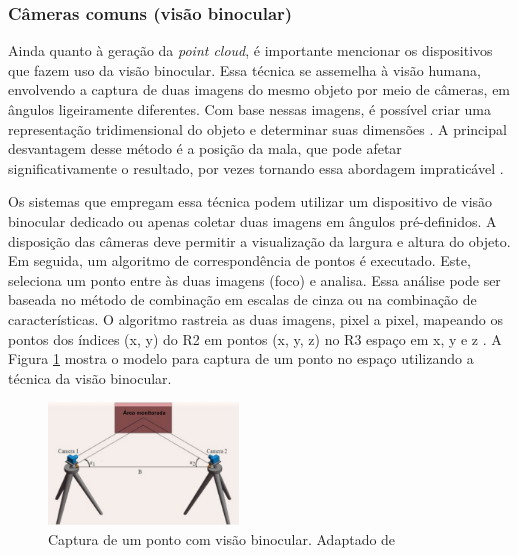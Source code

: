 \subsubsection{Câmeras comuns (visão binocular)}
\label{subsec_Cameras de visao binocular}

    Ainda quanto à geração da \textit{point cloud}, é importante mencionar os dispositivos que fazem uso da visão binocular. Essa técnica se assemelha à visão humana, envolvendo a captura de duas imagens do mesmo objeto por meio de câmeras, em ângulos ligeiramente diferentes. Com base nessas imagens, é possível criar uma representação tridimensional do objeto e determinar suas dimensões \cite{qingji_2018_method}. A principal desvantagem desse método é a posição da mala, que pode afetar significativamente o resultado, por vezes tornando essa abordagem impraticável \cite{gao_2013_baggage}.

    Os sistemas que empregam essa técnica podem utilizar um dispositivo de visão binocular dedicado ou apenas coletar duas imagens em ângulos pré-definidos. A disposição das câmeras deve permitir a visualização da largura e altura do objeto. Em seguida, um algoritmo de correspondência de pontos é executado. Este, seleciona um ponto entre às duas imagens (foco) e analisa. Essa análise pode ser baseada no método de combinação em escalas de cinza ou na combinação de características. O algoritmo rastreia as duas imagens, pixel a pixel, mapeando os pontos dos índices (x, y) do R2 em pontos (x, y, z) no R3 espaço em x, y e z \cite{sun_2019_threedimensional, qingji_2018_method, li_2017_the}. A Figura \ref{fig:visao_binocular} mostra o modelo para captura de um ponto no espaço utilizando a técnica da visão binocular.

        \begin{figure}[h]
           \centering
           \includegraphics[width=0.45\textwidth]{imagens/capturaDeUmPontoComVisaoBinocular.png} 
           \caption{Captura de um ponto com visão binocular. Adaptado de \cite{hu_2020_accuracy}}
           \label{fig:visao_binocular}
        \end{figure}
    

